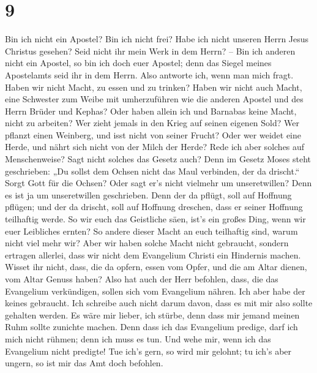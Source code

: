 \hypertarget{section-8}{%
\section{9}\label{section-8}}

 Bin ich nicht ein Apostel? Bin ich nicht frei? Habe ich
nicht unseren Herrn Jesus Christus gesehen? Seid nicht ihr mein Werk in
dem Herrn? --  Bin ich anderen nicht ein Apostel, so bin
ich doch euer Apostel; denn das Siegel meines Apostelamts seid ihr in
dem Herrn.  Also antworte ich, wenn man mich fragt.
 Haben wir nicht Macht, zu essen und zu trinken?
 Haben wir nicht auch Macht, eine Schwester zum Weibe mit
umherzuführen wie die anderen Apostel und des Herrn Brüder und Kephas?
 Oder haben allein ich und Barnabas keine Macht, nicht zu
arbeiten?  Wer zieht jemals in den Krieg auf seinen
eigenen Sold? Wer pflanzt einen Weinberg, und isst nicht von seiner
Frucht? Oder wer weidet eine Herde, und nährt sich nicht von der Milch
der Herde?  Rede ich aber solches auf Menschenweise? Sagt
nicht solches das Gesetz auch?  Denn im Gesetz Moses steht
geschrieben: „Du sollst dem Ochsen nicht das Maul verbinden, der da
drischt.`` Sorgt Gott für die Ochsen?  Oder sagt er's
nicht vielmehr um unseretwillen? Denn es ist ja um unseretwillen
geschrieben. Denn der da pflügt, soll auf Hoffnung pflügen; und der da
drischt, soll auf Hoffnung dreschen, dass er seiner Hoffnung teilhaftig
werde.  So wir euch das Geistliche säen, ist's ein großes
Ding, wenn wir euer Leibliches ernten?  So andere dieser
Macht an euch teilhaftig sind, warum nicht viel mehr wir? Aber wir haben
solche Macht nicht gebraucht, sondern ertragen allerlei, dass wir nicht
dem Evangelium Christi ein Hindernis machen.  Wisset ihr
nicht, dass, die da opfern, essen vom Opfer, und die am Altar dienen,
vom Altar Genuss haben?  Also hat auch der Herr befohlen,
dass, die das Evangelium verkündigen, sollen sich vom Evangelium nähren.
 Ich aber habe der keines gebraucht. Ich schreibe auch
nicht darum davon, dass es mit mir also sollte gehalten werden. Es wäre
mir lieber, ich stürbe, denn dass mir jemand meinen Ruhm sollte zunichte
machen.  Denn dass ich das Evangelium predige, darf ich
mich nicht rühmen; denn ich muss es tun. Und wehe mir, wenn ich das
Evangelium nicht predigte!  Tue ich's gern, so wird mir
gelohnt; tu ich's aber ungern, so ist mir das Amt doch befohlen.
